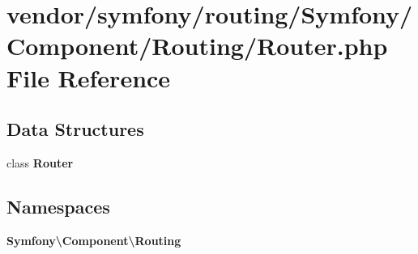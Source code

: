 \section{vendor/symfony/routing/\+Symfony/\+Component/\+Routing/\+Router.php File Reference}
\label{symfony_2routing_2_symfony_2_component_2_routing_2_router_8php}
\subsection*{Data Structures}
\begin{DoxyCompactItemize}
\item 
class {\bf Router}
\end{DoxyCompactItemize}
\subsection*{Namespaces}
\begin{DoxyCompactItemize}
\item 
 {\bf Symfony\textbackslash{}\+Component\textbackslash{}\+Routing}
\end{DoxyCompactItemize}
